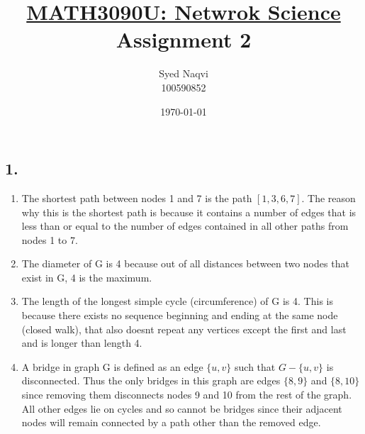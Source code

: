 \documentclass{article}
\title{\textbf{\underline{MATH3090U: Netwrok Science}\\Assignment 2}}
\author{Syed Naqvi\\100590852}
\date{\today}
\begin{document}
    \maketitle

    \subsection*{1.}    
    
    \vspace*{10pt}
    \begin{enumerate}[label=(\alph*), left=10pt, itemsep=10pt]
        
        \item \begin{minipage}[t]{0.9\textwidth}
                The shortest path between nodes 1 and 7 is the path $[1,3,6,7]$.
                The reason why this is the shortest path is because it contains a number of edges that
                is less than or equal to the number of edges contained in all other paths from nodes
                1 to 7.
            \end{minipage}
        
        \item \begin{minipage}[t]{0.9\textwidth}
                The diameter of G is 4 because out of all distances between two
                nodes that exist in G, 4 is the maximum.
            \end{minipage}
        
        \item \begin{minipage}[t]{0.9\textwidth}
                The length of the longest simple cycle (circumference) of G
                is 4. This is because there exists no sequence beginning
                and ending at the same node (closed walk), that also
                doesnt repeat any vertices except the first and last and is longer than length 4. 
            \end{minipage}

        \item \begin{minipage}[t]{0.9\textwidth}
                A bridge in graph G is defined as an edge $\{u,v\}$ such that $G-\{u,v\}$ is
                disconnected. Thus the only bridges in this graph are edges $\{8, 9\}$ and
                $\{8, 10\}$ since removing them disconnects nodes 9 and 10 from the rest of
                the graph. All other edges lie on cycles and so cannot be bridges since their
                adjacent nodes will remain connected by a path other than the removed edge.
            \end{minipage}


\end{enumerate}
\end{document}

